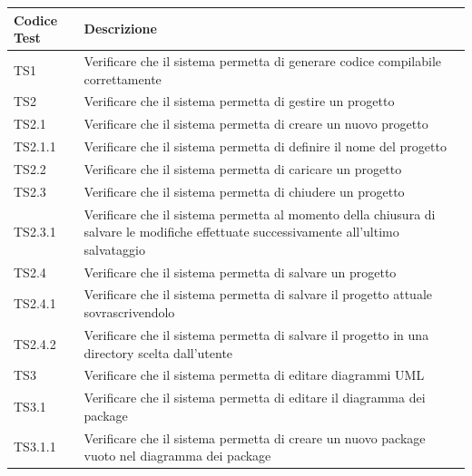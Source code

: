 \documentclass[../PianoDiQualifica.tex]{subfiles}
\begin{document}
	\begin{longtabu} to \textwidth {
			X[4,l,p]
			X[8,l,p]}
		\toprule
		 Codice Test & Descrizione \\
		\midrule
		\endhead
		\midrule
		\addlinespace[0.2em]
		TS1 & Verificare che il sistema permetta di generare codice compilabile correttamente \\
		\addlinespace[0.2em]
		\midrule
		\addlinespace[0.2em]
		TS2 & Verificare che il sistema permetta di gestire un progetto \\
		\addlinespace[0.2em]
		\midrule
		\addlinespace[0.2em]
		TS2.1 & Verificare che il sistema permetta di creare un nuovo progetto \\
		\addlinespace[0.2em]
		\midrule
		\addlinespace[0.2em]
		TS2.1.1 & Verificare che il sistema permetta di definire il nome del progetto \\
		\addlinespace[0.2em]
		\midrule
		\addlinespace[0.2em]
		TS2.2 & Verificare che il sistema permetta di caricare un progetto \\
		\addlinespace[0.2em]
		\midrule
		\addlinespace[0.2em]
		TS2.3 & Verificare che il sistema permetta di chiudere un progetto \\
		\addlinespace[0.2em]
		\midrule
		\addlinespace[0.2em]
		TS2.3.1 & Verificare che il sistema permetta al momento della chiusura di salvare le modifiche effettuate successivamente all'ultimo salvataggio \\
		\addlinespace[0.2em]
		\midrule
		\addlinespace[0.2em]
		TS2.4 & Verificare che il sistema permetta di salvare un progetto \\
		\addlinespace[0.2em]
		\midrule
		\addlinespace[0.2em]
		TS2.4.1 & Verificare che il sistema permetta di salvare il progetto attuale sovrascrivendolo \\
		\addlinespace[0.2em]
		\midrule
		\addlinespace[0.2em]
		TS2.4.2 & Verificare che il sistema permetta di salvare il progetto in una directory scelta dall'utente \\
		\addlinespace[0.2em]
		\midrule
		\addlinespace[0.2em]
		TS3 & Verificare che il sistema permetta di editare diagrammi UML \\
		\addlinespace[0.2em]
		\midrule
		\addlinespace[0.2em]
		TS3.1 & Verificare che il sistema permetta di editare il diagramma dei package \\
		\addlinespace[0.2em]
		\midrule
		\addlinespace[0.2em]
		TS3.1.1 & Verificare che il sistema permetta di creare un nuovo package vuoto nel diagramma dei package \\

\end{longtabu}
\end{document}
